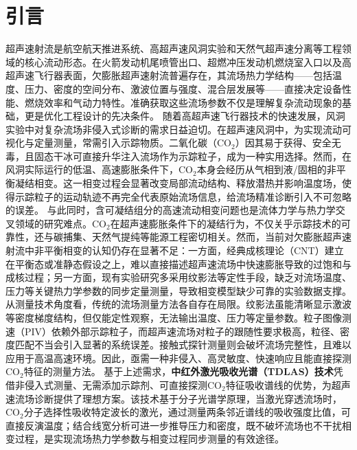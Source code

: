 ﻿\chapter{引言}
	超声速射流是航空航天推进系统、高超声速风洞实验和天然气超声速分离等工程领域的核心流动形态。在火箭发动机尾喷管出口、超燃冲压发动机燃烧室入口以及高超声速飞行器表面，欠膨胀超声速射流普遍存在，其流场热力学结构——包括温度、压力、密度的空间分布、激波位置与强度、混合层发展等——直接决定设备性能、燃烧效率和气动力特性。准确获取这些流场参数不仅是理解复杂流动现象的基础，更是优化工程设计的先决条件。
	随着高超声速飞行器技术的快速发展，风洞实验中对复杂流场非侵入式诊断的需求日益迫切。在超声速风洞中，为实现流动可视化与定量测量，常需引入示踪物质。二氧化碳（CO$_2$）因其易于获得、安全无毒，且固态干冰可直接升华注入流场作为示踪粒子，成为一种实用选择。然而，在风洞实际运行的低温、高速膨胀条件下，CO$_2$本身会经历从气相到液/固相的非平衡凝结相变。这一相变过程会显著改变局部流动结构、释放潜热并影响温度场，使得示踪粒子的运动轨迹不再完全代表原始流场信息，给流场精准诊断引入不可忽略的误差。
	与此同时，含可凝结组分的高速流动相变问题也是流体力学与热力学交叉领域的研究难点。CO$_2$在超声速膨胀条件下的凝结行为，不仅关乎示踪技术的可靠性，还与碳捕集、天然气提纯等能源工程密切相关。然而，当前对欠膨胀超声速射流中非平衡相变的认知仍存在显著不足：一方面，经典成核理论（CNT）建立在平衡态或准静态假设之上，难以直接描述超声速流场中快速膨胀导致的过饱和与成核过程；另一方面，现有实验研究多采用纹影法等定性手段，缺乏对流场温度、压力等关键热力学参数的同步定量测量，导致相变模型缺少可靠的实验数据支撑。
	从测量技术角度看，传统的流场测量方法各自存在局限。纹影法虽能清晰显示激波等密度梯度结构，但仅能定性观察，无法输出温度、压力等定量参数。粒子图像测速（PIV）依赖外部示踪粒子，而超声速流场对粒子的跟随性要求极高，粒径、密度匹配不当会引入显著的系统误差。接触式探针测量则会破坏流场完整性，且难以应用于高温高速环境。因此，亟需一种非侵入、高灵敏度、快速响应且能直接探测CO$_2$特征的测量方法。
	基于上述需求，\textbf{中红外激光吸收光谱（TDLAS）技术}凭借非侵入式测量、无需添加示踪剂、可直接探测CO$_2$特征吸收谱线的优势，为超声速流场诊断提供了理想方案。该技术基于分子光谱学原理，当激光穿透流场时，CO$_2$分子选择性吸收特定波长的激光，通过测量两条邻近谱线的吸收强度比值，可直接反演温度；结合线宽分析可进一步推导压力和密度，既不破坏流场也不干扰相变过程，是实现流场热力学参数与相变过程同步测量的有效途径。
